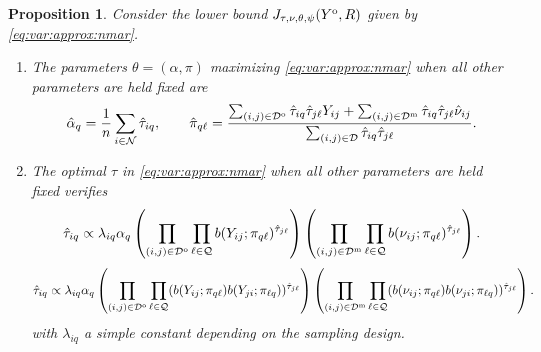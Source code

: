 \documentclass[10pt]{article}
\newcommand{\1}{\mathds{1}}
\newcommand{\MA}{Y}
\newcommand{\MAO}{\MA^\text{\rm o}}
\newcommand{\block}{\mathcal{Q}}
\newcommand{\dyad}{\mathcal{D}}
\newcommand{\dyadO}{\dyad^\text{\rm o}}
\newcommand{\dyadM}{\dyad^\text{\rm m}}
\newcommand{\node}{\mathcal{N}}
\newtheorem{proposition}{Proposition}
\begin{document}
\begin{proposition}\label{prop:nmar_common}
  Consider   the  lower   bound  $J_{\tau, \nu, \theta, \psi}(\MAO,R)$   given  by
  \eqref{eq:var:approx:nmar}.
  \begin{enumerate}
  \item The parameters $\theta=(\alpha, \pi)$ maximizing 
    \eqref{eq:var:approx:nmar} when all other parameters are held fixed are
    \begin{equation}\nonumber
      \hat{\alpha}_q=\frac{1}{n}\sum_{i\in\node} \hat{\tau}_{iq}, \qquad
      \hat{\pi}_{q\ell}=\frac{\sum_{(i,j)\in
          \dyadO}\hat{\tau}_{iq}\hat{\tau}_{j\ell}\MA_{ij}           +
        \sum_{(i,j)\in
          \dyadM}\hat{\tau}_{iq}\hat{\tau}_{j\ell}\hat{\nu}_{ij}}{\sum_{(i,j)\in\dyad}\hat{\tau}_{iq}\hat{\tau}_{j\ell}}.      
    \end{equation}
  \item  The optimal  $\tau$  in  \eqref{eq:var:approx:nmar} when  all
    other parameters are held fixed verifies
    \begin{equation}\nonumber
      \hat{\tau}_{iq}\propto \lambda_{iq} \alpha_{q} \left( \prod_{(i,j)\in \dyadO}
        \prod_{\ell\in\block}                                       b(\MA_{ij};
        \pi_{q\ell})^{\hat{\tau}_{j\ell}}\right)
      \left( \prod_{(i,j)\in \dyadM}
        \prod_{\ell\in\block} b(\nu_{ij}; \pi_{q\ell})^{\hat{\tau}_{j\ell}}\right).
    \end{equation}
        \textcolor{red}{    \begin{equation} \nonumber
      \hat{\tau}_{iq}\propto \lambda_{iq} \alpha_{q} \left( \prod_{(i,j)\in \dyadO}
        \prod_{\ell\in\block} (b(\MA_{ij}; \pi_{q\ell})b(\MA_{ji}; \pi_{\ell q}))^{\hat{\tau}_{j\ell}}\right)
      \left( \prod_{(i,j)\in \dyadM}
        \prod_{\ell\in\block} (b(\nu_{ij}; \pi_{q\ell})b(\nu_{ji}; \pi_{\ell q}))^{\hat{\tau}_{j\ell}}\right).
    \end{equation}}
    with $\lambda_{iq}$ a simple constant depending on the sampling design.
  \end{enumerate}
\end{proposition}
\end{document}
